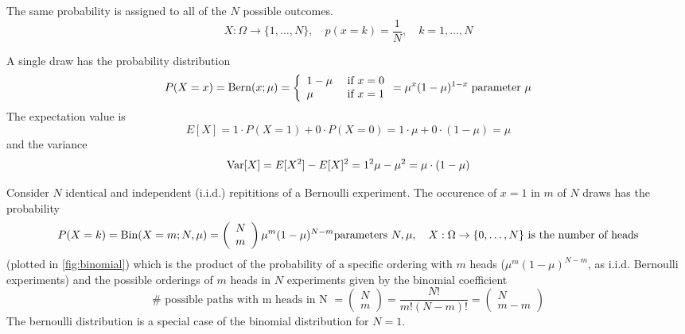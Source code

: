 The same probability is assigned to all of the $N$ possible outcomes.
\begin{equation}
    X: \Omega \rightarrow \{1,\dots,N\}, \quad p(x=k) = \frac{1}{N}, \quad k = 1,\dots,N
\end{equation}

A single draw has the probability distribution
\begin{equation}
    P(X=x)=\operatorname{Bern}(x ; \mu)=\left\{\begin{array}{ll}
    1-\mu & \text { if } x=0 \\
    \mu & \text { if } x=1
    \end{array}=\mu^x(1-\mu)^{1-x}\right. \\
    \text{parameter } \mu
\end{equation}
The expectation value is
\begin{equation}
    E[X] = 1\cdot P(X=1) + 0 \cdot P(X = 0) = 1\cdot \mu + 0\cdot (1-\mu) = \mu
\end{equation}
and the variance
\begin{equation}
    \operatorname{Var}[X] = E[X^2] - E[X]^2 = 1^2 \mu - \mu^2 = \mu \cdot (1-\mu)
\end{equation}

Consider $N$ identical and independent (i.i.d.) repititions of a Bernoulli experiment.
The occurence of $x=1$ in $m$ of $N$ draws has the probability
\begin{equation}
    P(X=k)=\operatorname{Bin}(X=m ; N, \mu)=\left(\begin{array}{l}
        N \\
        m
        \end{array}\right) \mu^m(1-\mu)^{N-m} \\
        \text{parameters } N, \mu, \quad X: \Omega \rightarrow \{0,\dots,N\} \text{ is the number of heads}
\end{equation}
(plotted in \ref{fig:binomial}) which is the product of the probability of a specific ordering with $m$ heads ($\mu^m(1-\mu)^{N-m}$,
as i.i.d. Bernoulli experiments) and the possible orderings of $m$ heads in $N$ experiments given
by the binomial coefficient
\begin{equation}
    \# \text{ possible paths with m heads in N } = \left( \begin{array}{c} N \\ m \end{array} \right) = \frac{N!}{m!(N-m)!} = \left( \begin{array}{c} N \\ m-m \end{array} \right)
\end{equation}
The bernoulli distribution is a special case of the binomial distribution for $N=1$.

